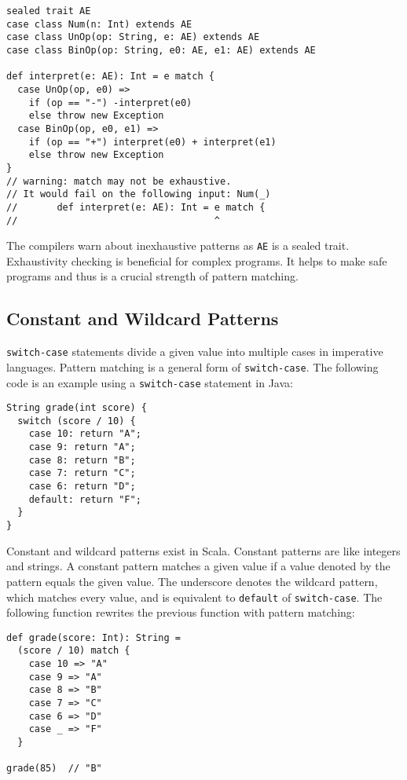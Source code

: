 \begin{verbatim}
sealed trait AE
case class Num(n: Int) extends AE
case class UnOp(op: String, e: AE) extends AE
case class BinOp(op: String, e0: AE, e1: AE) extends AE

def interpret(e: AE): Int = e match {
  case UnOp(op, e0) =>
    if (op == "-") -interpret(e0)
    else throw new Exception
  case BinOp(op, e0, e1) =>
    if (op == "+") interpret(e0) + interpret(e1)
    else throw new Exception
}
// warning: match may not be exhaustive.
// It would fail on the following input: Num(_)
//       def interpret(e: AE): Int = e match {
//                                   ^
\end{verbatim}

The compilers warn about inexhaustive patterns as \verb!AE! is a sealed trait.
Exhaustivity checking is beneficial for complex programs. It helps to make safe
programs and thus is a crucial strength of pattern matching.

\subsection{Constant and Wildcard Patterns}

\verb!switch-case! statements divide a given value into multiple cases in
imperative languages. Pattern matching is a general form of \verb!switch-case!.
The following code is an example using a \verb!switch-case! statement in Java:

\begin{verbatim}
String grade(int score) {
  switch (score / 10) {
    case 10: return "A";
    case 9: return "A";
    case 8: return "B";
    case 7: return "C";
    case 6: return "D";
    default: return "F";
  }
}
\end{verbatim}

Constant and wildcard patterns exist in Scala. Constant patterns are
 like integers and strings. A constant pattern matches a given
value if a value denoted by the pattern equals the given value. The underscore
denotes the wildcard pattern, which matches every value, and is equivalent to
\verb!default! of \verb!switch-case!. The following function rewrites the
previous function with pattern matching:

\begin{verbatim}
def grade(score: Int): String =
  (score / 10) match {
    case 10 => "A"
    case 9 => "A"
    case 8 => "B"
    case 7 => "C"
    case 6 => "D"
    case _ => "F"
  }

grade(85)  // "B"
\end{verbatim}


